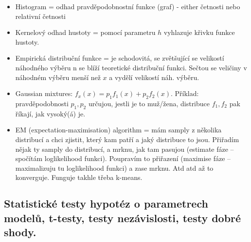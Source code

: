 \documentclass[a4paper,hidelinks]{article}
\begin{document}
\begin{itemize}
\begin{itemize}
    \end{itemize}
    \item Histogram = odhad pravděpodobnostní funkce (graf) - either četnosti nebo relativní četnosti
    \item Kernelový odhad hustoty = pomocí parametru $h$ vyhlazuje křivku funkce hustoty.
    \item Empirická distribuční funkce = je schodovitá, se zvětšující se velikostí náhodného výběru n se blíží teoretické distribuční funkci. Sečtou se veličiny v náhodném výběru menší než $x$ a vydělí velikostí náh. výběru.
    \item Gaussian mixtures: $f_x(x) = p_1 f_1(x) + p_2 f_2(x)$. Příklad: pravděpodobnosti $p_1, p_2$ určujou, jestli je to muž/žena, distribuce $f_1, f_2$ pak říkají, jak vysoký(á) je.
    \item EM (expectation-maximisation) algorithm = mám samply z několika distribucí a chci zjistit, který kam patří a jaký distribuce to jsou. Přiřadím nějak ty samply do distribucí, a mrknu, jak tam pasujou (estimate fáze -- spočítám loglikelihood funkci). Poupravím to přiřazení (maximise fáze -- maximalizuju tu loglikelihood funkci) a zase mrknu. Atd atd až to konverguje. Funguje takhle třeba k-means.
\end{itemize}

\subsection{Statistické testy hypotéz o parametrech modelů, t-testy, testy nezávislosti, testy dobré shody.}
\end{document}
